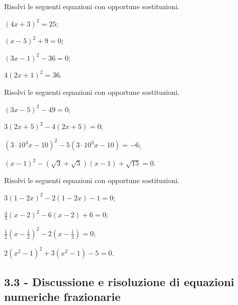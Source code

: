\begin{esercizio}[\Ast]
 \label{ese:3.33}
Risolvi le seguenti equazioni con opportune sostituzioni.
\begin{multicols}{2}
\begin{enumeratea}
\item $(4x + 3)^{2} = 25$;
\item $(x-5)^{2} + 9 = 0$;
\item $(3x-1)^{2}-36 = 0$;
\item $4 (2x + 1)^{2} = 36$.
\end{enumeratea}
\end{multicols}
\end{esercizio}

\begin{esercizio}[\Ast]
\label{ese:3.34}
Risolvi le seguenti equazioni con opportune sostituzioni.
\begin{multicols}{2}
\begin{enumeratea}
\item $(3x-5)^{2}-49 = 0$;
\item $3 (2x + 5)^{2}-4 (2x + 5) = 0$;
\item $(3 \cdot 10^{3} x-10)^{2}-5 (3 \cdot 10^{3} x-10) = -6$;
\item $(x-1)^{2}-(\sqrt{3} + \sqrt{5}) (x-1) + \sqrt{15} =0$.
\end{enumeratea}
\end{multicols}
\end{esercizio}

\begin{esercizio}[\Ast]
\label{ese:3.35}
Risolvi le seguenti equazioni con opportune sostituzioni.
\begin{multicols}{2}
\begin{enumeratea}
\item $3 (1-2x)^{2}-2 (1-2x)-1 = 0$;
\item $\frac{4}{3} (x-2)^{2}-6 (x-2) + 6 = 0$;
\item $\frac{1}{2} \left(x-\frac{1}{2} \right)^{2}-2 \left(x -\frac{1}{2} \right) = 0$;
\item $2 (x^{2}-1)^{2} + 3 (x^{2}-1)-5 = 0$.
\end{enumeratea}
\end{multicols}
\end{esercizio}

\subsection*{3.3 - Discussione e risoluzione di equazioni numeriche frazionarie}

